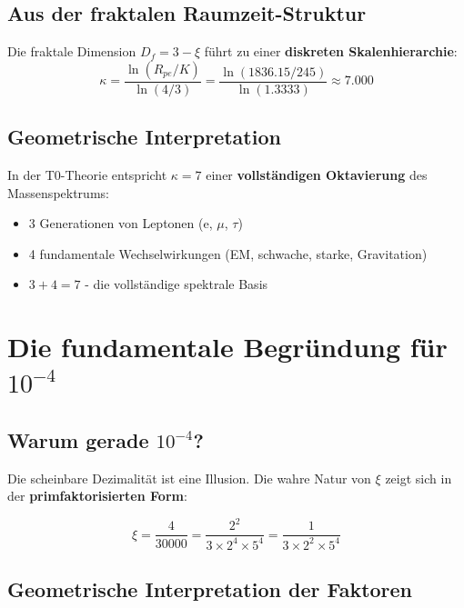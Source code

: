 	\subsection{Aus der fraktalen Raumzeit-Struktur}
	
	Die fraktale Dimension $D_f = 3 - \xi$ führt zu einer \textbf{diskreten Skalenhierarchie}:
	\begin{equation}
		\kappa = \frac{\ln(R_{pe}/K)}{\ln(4/3)} = \frac{\ln(1836.15/245)}{\ln(1.3333)} \approx 7.000
	\end{equation}
	
	\subsection{Geometrische Interpretation}
	
	In der T0-Theorie entspricht $\kappa = 7$ einer \textbf{vollständigen Oktavierung} des Massenspektrums:
	\begin{itemize}
		\item 3 Generationen von Leptonen (e, $\mu$, $\tau$)
		\item 4 fundamentale Wechselwirkungen (EM, schwache, starke, Gravitation)
		\item $3 + 4 = 7$ - die vollständige spektrale Basis
	\end{itemize}
	
	\section{Die fundamentale Begründung für $10^{-4}$}
	
	\subsection{Warum gerade $10^{-4}$?}
	
	Die scheinbare Dezimalität ist eine Illusion. Die wahre Natur von $\xi$ zeigt sich in der \textbf{primfaktorisierten Form}:
	
	\begin{tcolorbox}[colback=green!5!white,colframe=green!75!black,title={Fundamentale Faktorisierung}]
		\begin{equation}
			\xi = \frac{4}{30000} = \frac{2^2}{3 \times 2^4 \times 5^4} = \frac{1}{3 \times 2^2 \times 5^4}
		\end{equation}
	\end{tcolorbox}
	
	\subsection{Geometrische Interpretation der Faktoren}
	
